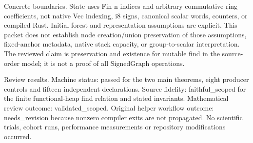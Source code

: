 \documentclass[10pt]{article}
\begin{document}
Concrete boundaries. State uses Fin n indices and arbitrary commutative-ring coefficients, not native Vec indexing, i8 signs, canonical scalar words, counters, or compiled Rust. Initial forest and representation assumptions are explicit. This packet does not establish node creation/union preservation of those assumptions, fixed-anchor metadata, native stack capacity, or group-to-scalar interpretation. The reviewed claim is preservation and existence for mutable find in the source-order model; it is not a proof of all SignedGraph operations.\par\medskip
Review results. Machine status: passed for the two main theorems, eight producer controls and fifteen independent declarations. Source fidelity: faithful\_scoped for the finite functional-heap find relation and stated invariants. Mathematical review outcome: validated\_scoped. Original helper workflow outcome: needs\_revision because nonzero compiler exits are not propagated. No scientific trials, cohort runs, performance measurements or repository modifications occurred.\par\medskip
\end{document}
